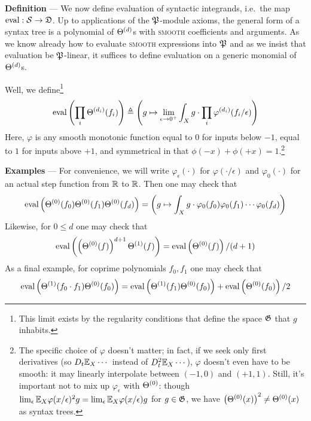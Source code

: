     \textbf{Definition} ---
    We now define evaluation of syntactic integrands, i.e.\ the map
    $\text{eval}:{\mathcal S}\to{\frak D}$.  Up to applications of the $\frak
    P$-module axioms, the general form of a syntax tree is a polynomial of
    $\Theta^{(d)}$s with \textsc{smooth} coefficients and arguments.  As we know
    already how to evaluate \textsc{smooth} expressions into $\frak P$ and as
    we insist that evaluation be $\frak P$-linear, it suffices to define
    evaluation on a generic monomial of $\Theta^{(d)}$s.

    Well, we define\footnote{
        This limit exists by the regularity conditions that define the space $\frak G$ that $g$ inhabits.
    }
    $$
        \text{eval}\left(\prod_i \Theta^{(d_i)}(f_i)\right)
        \triangleq
        \left(
            g \mapsto
            \lim_{\epsilon\to 0^+}
            \int_X g \cdot
            \prod_i \varphi^{(d_i)}(f_i/\epsilon) 
        \right)
    $$
    Here, $\varphi$ is any smooth monotonic function equal to $0$ for inputs
    below $-1$, equal to $1$ for inputs above $+1$, and symmetrical in
    that $\phi(-x)+\phi(+x)=1$.\footnote{
        The specific choice of $\varphi$ doesn't matter; in fact,
        if we seek only first derivatives (so $D_t {\mathbb E}_X \cdots$ instead of
        $D_t^2 {\mathbb E}_X \cdots$), $\varphi$ doesn't even have to be smooth: it
        may linearly interpolate between $(-1,0)$ and $(+1,1)$.
        Still, it's important not to mix up $\varphi_\epsilon$ with
        $\Theta^{(0)}$: though $\lim_\epsilon {\mathbb E}_X \varphi(x/\epsilon)^2 g =
        \lim_\epsilon {\mathbb E}_X \varphi(x/\epsilon) g$ for $g\in \frak G$, we
        have $\left(\Theta^{(0)}(x)\right)^2 \neq \Theta^{(0)}(x)$ as syntax trees.
    }
    
    \textbf{Examples} ---
    For convenience, we will write $\varphi_\epsilon(\cdot)$ for
    $\varphi(\cdot/\epsilon)$ and $\varphi_0(\cdot)$ for an actual step
    function from ${\mathbb R}$ to ${\mathbb R}$.  Then one may check that 
    $$
        \text{eval}\left(\Theta^{(0)}(f_0)\Theta^{(0)}(f_1)\Theta^{(0)}(f_d)\right)
        =
        \left(
            g \mapsto
            \int_X g \cdot \varphi_0(f_0)\varphi_0(f_1)\cdots\varphi_0(f_d)
        \right)
    $$
    Likewise, for $0\leq d$ one may check that
    $$
        \text{eval}\left(\left(\Theta^{(0)}(f)\right)^{d+1}\Theta^{(1)}(f)\right) 
        =
        \text{eval}\left(\Theta^{(0)}(f)\right) / (d+1)
    $$
    As a final example, for coprime polynomials $f_0, f_1$ one may check that
    $$
        \text{eval}\left(\Theta^{(1)}(f_0\cdot f_1)\Theta^{(0)}(f_0)\right) 
        =
        \text{eval}\left(\Theta^{(1)}(f_1)\Theta^{(0)}(f_0)\right) 
        +
        \text{eval}\left(\Theta^{(0)}(f_0)\right)/2 
    $$

